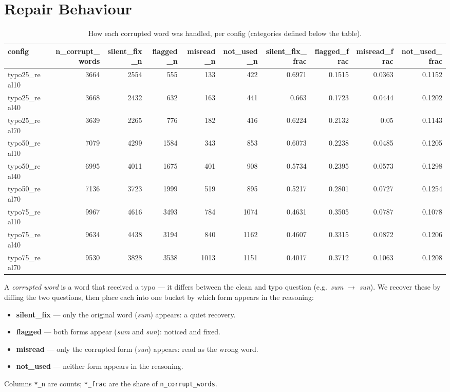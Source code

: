 \documentclass[11pt]{article}
\begin{document}
\section*{Repair Behaviour}
\begin{table}[H]
\centering
\caption{How each corrupted word was handled, per config (categories defined below the table).}
\small
\begin{adjustbox}{max width=\textwidth}
\begin{tabular}{lrrrrrrrrr}
\toprule
\textbf{config} & \textbf{n\_corrupt\_words} & \textbf{silent\_fix\_n} & \textbf{flagged\_n} & \textbf{misread\_n} & \textbf{not\_used\_n} & \textbf{silent\_fix\_frac} & \textbf{flagged\_frac} & \textbf{misread\_frac} & \textbf{not\_used\_frac} \\
\midrule
typo25\_real10 & 3664 & 2554 & 555 & 133 & 422 & 0.6971 & 0.1515 & 0.0363 & 0.1152 \\
typo25\_real40 & 3668 & 2432 & 632 & 163 & 441 & 0.663 & 0.1723 & 0.0444 & 0.1202 \\
typo25\_real70 & 3639 & 2265 & 776 & 182 & 416 & 0.6224 & 0.2132 & 0.05 & 0.1143 \\
typo50\_real10 & 7079 & 4299 & 1584 & 343 & 853 & 0.6073 & 0.2238 & 0.0485 & 0.1205 \\
typo50\_real40 & 6995 & 4011 & 1675 & 401 & 908 & 0.5734 & 0.2395 & 0.0573 & 0.1298 \\
typo50\_real70 & 7136 & 3723 & 1999 & 519 & 895 & 0.5217 & 0.2801 & 0.0727 & 0.1254 \\
typo75\_real10 & 9967 & 4616 & 3493 & 784 & 1074 & 0.4631 & 0.3505 & 0.0787 & 0.1078 \\
typo75\_real40 & 9634 & 4438 & 3194 & 840 & 1162 & 0.4607 & 0.3315 & 0.0872 & 0.1206 \\
typo75\_real70 & 9530 & 3828 & 3538 & 1013 & 1151 & 0.4017 & 0.3712 & 0.1063 & 0.1208 \\
\bottomrule
\end{tabular}
\end{adjustbox}
\end{table}

\noindent A \emph{corrupted word} is a word that received a
typo --- it differs between the clean and typo question (e.g.\ \emph{sum} $\to$
\emph{sun}). We recover these by diffing the two questions, then place each into one
bucket by which form appears in the reasoning:
\begin{itemize}\setlength{\itemsep}{1pt}
  \item \textbf{silent\_fix} --- only the original word (\emph{sum}) appears: a quiet recovery.
  \item \textbf{flagged} --- both forms appear (\emph{sum} and \emph{sun}): noticed and fixed.
  \item \textbf{misread} --- only the corrupted form (\emph{sun}) appears: read as the wrong word.
  \item \textbf{not\_used} --- neither form appears in the reasoning.
\end{itemize}
\noindent Columns \texttt{*\_n} are counts; \texttt{*\_frac} are the share of
\texttt{n\_corrupt\_words}.
\medskip
\end{document}
